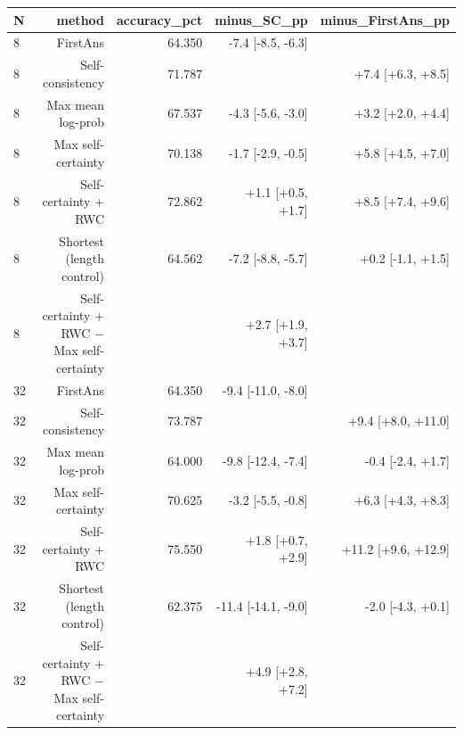 \begin{tabular}{lrrrr}
\toprule
N & method & accuracy\_pct & minus\_SC\_pp & minus\_FirstAns\_pp \\
\midrule
8 & FirstAns & 64.350 & -7.4 [-8.5, -6.3] &  \\
8 & Self-consistency & 71.787 &  & +7.4 [+6.3, +8.5] \\
8 & Max mean log-prob & 67.537 & -4.3 [-5.6, -3.0] & +3.2 [+2.0, +4.4] \\
8 & Max self-certainty & 70.138 & -1.7 [-2.9, -0.5] & +5.8 [+4.5, +7.0] \\
8 & Self-certainty + RWC & 72.862 & +1.1 [+0.5, +1.7] & +8.5 [+7.4, +9.6] \\
8 & Shortest (length control) & 64.562 & -7.2 [-8.8, -5.7] & +0.2 [-1.1, +1.5] \\
8 & Self-certainty + RWC − Max self-certainty &  & +2.7 [+1.9, +3.7] &  \\
32 & FirstAns & 64.350 & -9.4 [-11.0, -8.0] &  \\
32 & Self-consistency & 73.787 &  & +9.4 [+8.0, +11.0] \\
32 & Max mean log-prob & 64.000 & -9.8 [-12.4, -7.4] & -0.4 [-2.4, +1.7] \\
32 & Max self-certainty & 70.625 & -3.2 [-5.5, -0.8] & +6.3 [+4.3, +8.3] \\
32 & Self-certainty + RWC & 75.550 & +1.8 [+0.7, +2.9] & +11.2 [+9.6, +12.9] \\
32 & Shortest (length control) & 62.375 & -11.4 [-14.1, -9.0] & -2.0 [-4.3, +0.1] \\
32 & Self-certainty + RWC − Max self-certainty &  & +4.9 [+2.8, +7.2] &  \\
\bottomrule
\end{tabular}

